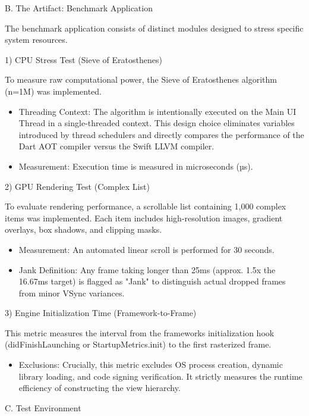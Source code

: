 \documentclass[
]{article}
\begin{document}
B. The Artifact: Benchmark Application

The benchmark application consists of distinct modules designed to
stress specific system resources.

1) CPU Stress Test (Sieve of Eratosthenes)

To measure raw computational power, the Sieve of Eratosthenes algorithm
(n=1M) was implemented.

\begin{itemize}
\item
  Threading Context: The algorithm is intentionally executed on the Main
  UI Thread in a single-threaded context. This design choice eliminates
  variables introduced by thread schedulers and directly compares the
  performance of the Dart AOT compiler versus the Swift LLVM compiler.
\item
  Measurement: Execution time is measured in microseconds (µs).
\end{itemize}

2) GPU Rendering Test (Complex List)

To evaluate rendering performance, a scrollable list containing 1,000
complex items was implemented. Each item includes high-resolution
images, gradient overlays, box shadows, and clipping masks.

\begin{itemize}
\item
  Measurement: An automated linear scroll is performed for 30 seconds.
\item
  Jank Definition: Any frame taking longer than 25ms (approx. 1.5x the
  16.67ms target) is flagged as "Jank" to distinguish actual dropped
  frames from minor VSync variances.
\end{itemize}

3) Engine Initialization Time (Framework-to-Frame)

This metric measures the interval from the framework\textquotesingle s
initialization hook (didFinishLaunching or StartupMetrics.init) to the
first rasterized frame.

\begin{itemize}
\item
  Exclusions: Crucially, this metric excludes OS process creation,
  dynamic library loading, and code signing verification. It strictly
  measures the runtime efficiency of constructing the view hierarchy.
\end{itemize}

C. Test Environment
\end{document}
